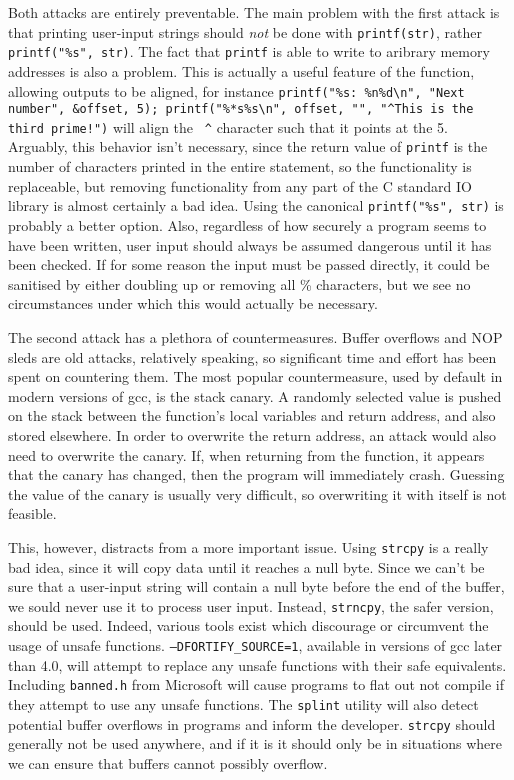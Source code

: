 Both attacks are entirely preventable. The main problem with the first attack is that printing user-input strings should
\emph{not} be done with {\tt printf(str)}, rather {\tt printf("\%s", str)}. The fact that {\tt printf} is able to write
to aribrary memory addresses is also a problem. This is actually a useful feature of the function, allowing outputs to
be aligned, for instance {\tt printf("\%s: \%n\%d\textbackslash n", "Next number", \&offset, 5);
printf("\%*s\%s\textbackslash n", offset, "", "\textasciicircum This is the third prime!")} will align the {\tt
\textasciicircum} character such that it points at the 5. Arguably, this behavior isn't necessary, since the return
value of {\tt printf} is the number of characters printed in the entire statement, so the functionality is replaceable,
but removing functionality from any part of the C standard IO library is almost certainly a bad idea. Using the
canonical {\tt printf("\%s", str)} is probably a better option. Also, regardless of how securely a program seems to have
been written, user input should always be assumed dangerous until it has been checked. If for some reason the input must
be passed directly, it could be sanitised by either doubling up or removing all \% characters, but we see no
circumstances under which this would actually be necessary.

The second attack has a plethora of countermeasures. Buffer overflows and NOP sleds are old attacks, relatively speaking, so
significant time and effort has been spent on countering them. The most popular countermeasure, used by default in
modern versions of gcc, is the stack canary. A randomly selected value is pushed on the stack between the function's
local variables and return address, and also stored elsewhere. In order to overwrite the return address, an attack would
also need to overwrite the canary. If, when returning from the function, it appears that the canary has changed, then
the program will immediately crash. Guessing the value of the canary is usually very difficult, so overwriting it with
itself is not feasible.

This, however, distracts from a more important issue. Using {\tt strcpy} is a really bad idea, since it will copy data
until it reaches a null byte. Since we can't be sure that a user-input string will contain a null byte before the end of
the buffer, we sould never use it to process user input. Instead, {\tt strncpy}, the safer version, should be used.
Indeed, various tools exist which discourage or circumvent the usage of unsafe functions.
{\tt --DFORTIFY\_SOURCE=1}, available in versions of gcc later than 4.0, will attempt to replace any unsafe functions
with their safe equivalents. Including {\tt banned.h} from Microsoft
will cause programs to flat out not compile if they attempt to use any unsafe functions. The {\tt splint} utility will
also detect potential buffer overflows in programs and inform the developer. {\tt strcpy} should generally not be used
anywhere, and if it is it should only be in situations where we can ensure that buffers cannot possibly overflow.

